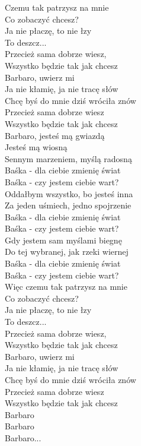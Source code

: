 
\begin{text}
    Czemu tak patrzysz na mnie\\
    Co zobaczyć chcesz?\\
    Ja nie płaczę, to nie łzy\\
    To deszcz...\\
    Przecież sama dobrze wiesz,\\
    Wszystko będzie tak jak chcesz\\
    Barbaro, uwierz mi\\
    Ja nie kłamię, ja nie tracę słów\\
    Chcę byś do mnie dziś wróciła znów\\
    Przecież sama dobrze wiesz\\
    Wszystko będzie tak jak chcesz\\
    Barbaro, jesteś mą gwiazdą\\
    Jesteś mą wiosną\\
    Sennym marzeniem, myślą radosną\\
    Baśka - dla ciebie zmienię świat\\
    Baśka - czy jestem ciebie wart?\\
    Oddałbym wszystko, bo jesteś inna\\
    Za jeden uśmiech, jedno spojrzenie\\
    Baśka - dla ciebie zmienię świat\\
    Baśka - czy jestem ciebie wart?\\
    Gdy jestem sam myślami biegnę\\
    Do tej wybranej, jak rzeki wiernej\\
    Baśka - dla ciebie zmienię świat\\
    Baśka - czy jestem ciebie wart?\\
    Więc czemu tak patrzysz na mnie\\
    Co zobaczyć chcesz?\\
    Ja nie płaczę, to nie łzy\\
    To deszcz...\\
    Przecież sama dobrze wiesz,\\
    Wszystko będzie tak jak chcesz\\
    Barbaro, uwierz mi\\
    Ja nie kłamię, ja nie tracę słów\\
    Chcę byś do mnie dziś wróciła znów\\
    Przecież sama dobrze wiesz\\
    Wszystko będzie tak jak chcesz\\
    Barbaro\\
    Barbaro\\
    Barbaro...
\end{text}
\begin{chord}

\end{chord}